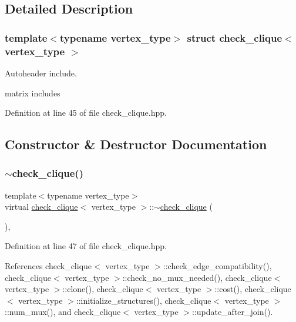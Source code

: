 \subsection{Detailed Description}
\subsubsection*{template$<$typename vertex\+\_\+type$>$\newline
struct check\+\_\+clique$<$ vertex\+\_\+type $>$}

Autoheader include. 

matrix includes 

Definition at line 45 of file check\+\_\+clique.\+hpp.



\subsection{Constructor \& Destructor Documentation}
\mbox{\label{structcheck__clique_ab59f1c6c2117663f375f89fc98a145d7}} 
\subsubsection{\texorpdfstring{$\sim$check\+\_\+clique()}{~check\_clique()}}
{\footnotesize\ttfamily template$<$typename vertex\+\_\+type$>$ \\
virtual \hyperlink{structcheck__clique}{check\+\_\+clique}$<$ vertex\+\_\+type $>$\+::$\sim$\hyperlink{structcheck__clique}{check\+\_\+clique} (\begin{DoxyParamCaption}{ }\end{DoxyParamCaption})\hspace{0.3cm}{\ttfamily [inline]}, {\ttfamily [virtual]}}



Definition at line 47 of file check\+\_\+clique.\+hpp.



References check\+\_\+clique$<$ vertex\+\_\+type $>$\+::check\+\_\+edge\+\_\+compatibility(), check\+\_\+clique$<$ vertex\+\_\+type $>$\+::check\+\_\+no\+\_\+mux\+\_\+needed(), check\+\_\+clique$<$ vertex\+\_\+type $>$\+::clone(), check\+\_\+clique$<$ vertex\+\_\+type $>$\+::cost(), check\+\_\+clique$<$ vertex\+\_\+type $>$\+::initialize\+\_\+structures(), check\+\_\+clique$<$ vertex\+\_\+type $>$\+::num\+\_\+mux(), and check\+\_\+clique$<$ vertex\+\_\+type $>$\+::update\+\_\+after\+\_\+join().


